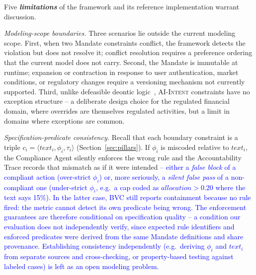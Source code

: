 \documentclass[runningheads]{llncs}
\begin{document}
Five \textbf{\textit{limitations}} of the framework and its reference implementation warrant discussion.

\textit{Modeling-scope boundaries. }
Three scenarios lie outside the current modeling scope. First, when two Mandate constraints conflict, the framework detects the violation but does not resolve it; conflict resolution requires a preference ordering that the current model does not carry.
Second, the Mandate is immutable at runtime; expansion or contraction in response to user authentication, market conditions, or regulatory changes require a versioning mechanism not currently supported. Third, unlike defeasible deontic logic~\cite{governatori2005meeting}, \textsc{AI-Intent} constraints have no exception structure -- a deliberate design choice for the regulated financial domain, where overrides are themselves regulated activities, but a limit in domains where exceptions are common.

\textit{Specification-predicate consistency.} Recall that each boundary constraint is a triple $c_i = \langle \mathit{text}_i, \phi_i, \tau_i \rangle$ (Section~\ref{sec:pillars}). If $\phi_i$ is miscoded relative to $\mathit{text}_i$, the Compliance Agent silently enforces the wrong rule and the Accountability Trace records that mismatch as if it were intended 
\textcolor{blue}{ -- either a \emph{false block} of a compliant action (over-strict $\phi_i$) or, more seriously, a \emph{silent false pass} of a non-compliant one (under-strict $\phi_i$, e.g.\ a cap coded as $\mathit{allocation} > 0.20$ where the text says 15\%). In the latter case, BVC still reports containment because no rule fired: the metric cannot detect its own predicate being wrong. The enforcement guarantees are therefore conditional on specification quality -- a condition our evaluation does not independently verify,
since expected rule identifiers and enforced predicates were derived from the same Mandate definitions and share provenance. Establishing consistency independently (e.g.\ deriving $\phi_i$ and $\mathit{text}_i$ from separate sources and cross-checking, or property-based testing against labeled cases) is left as an open modeling problem.}
\end{document}
